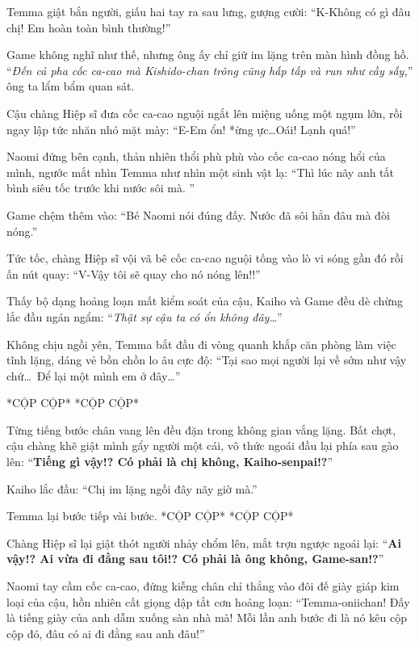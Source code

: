 \documentclass[../main.tex]{subfiles}
\begin{document}
Temma giật bắn người, giấu hai tay ra sau lưng, gượng cười: ``K-Không có gì đâu chị! Em hoàn toàn bình thường!''

Game không nghĩ như thế, nhưng ông ấy chỉ giữ im lặng trên màn hình đồng hồ. ``\textit{Đến cả pha cốc ca-cao mà Kishido-chan trông cũng hấp tấp và run như cầy sấy,}'' ông ta lẩm bẩm quan sát.

Cậu chàng Hiệp sĩ đưa cốc ca-cao nguội ngắt lên miệng uống một ngụm lớn, rồi ngay lập tức nhăn nhó mặt mày: ``E-Em ổn! *ừng ực\dots* Oái! Lạnh quá!''

Naomi đứng bên cạnh, thản nhiên thổi phù phù vào cốc ca-cao nóng hổi của mình, ngước mắt nhìn Temma như nhìn một sinh vật lạ: ``Thì lúc nãy anh tắt bình siêu tốc trước khi nước sôi mà. ''

Game chệm thêm vào: ``Bé Naomi nói đúng đấy. Nước đã sôi hẳn đâu mà đòi nóng.''

Tức tốc, chàng Hiệp sĩ vội vã bê cốc ca-cao nguội tống vào lò vi sóng gần đó rồi ấn nút quay: ``V-Vậy tôi sẽ quay cho nó nóng lên!!''


Thấy bộ dạng hoảng loạn mất kiểm soát của cậu, Kaiho và Game đều dè chừng lắc đầu ngán ngẩm: ``\textit{Thật sự cậu ta có ổn không đây\dots}''

Không chịu ngồi yên, Temma bắt đầu đi vòng quanh khắp căn phòng làm việc tĩnh lặng, dáng vẻ bồn chồn lo âu cực độ: ``Tại sao mọi người lại về sớm như vậy chứ\dots\ Để lại một mình em ở đây\dots''

*CỘP CỘP* *CỘP CỘP*

Từng tiếng bước chân vang lên đều đặn trong không gian vắng lặng. Bất chợt, cậu chàng khẽ giật mình gẩy người một cái, vô thức ngoái đầu lại phía sau gào lên: ``\textbf{Tiếng gì vậy!? Có phải là chị không, Kaiho-senpai!?}''

Kaiho lắc đầu: ``Chị im lặng ngồi đây nãy giờ mà.''

Temma lại bước tiếp vài bước. *CỘP CỘP* *CỘP CỘP*

Chàng Hiệp sĩ lại giật thót người nhảy chổm lên, mắt trợn ngược ngoái lại: ``\textbf{Ai vậy!? Ai vừa đi đằng sau tôi!? Có phải là ông không, Game-san!?}''


Naomi tay cầm cốc ca-cao, đứng kiễng chân chỉ thẳng vào đôi đế giày giáp kim loại của cậu, hồn nhiên cất giọng dập tắt cơn hoảng loạn: ``Temma-oniichan! Đấy là tiếng giày của anh dẫm xuống sàn nhà mà! Mỗi lần anh bước đi là nó kêu cộp cộp đó, đâu có ai đi đằng sau anh đâu!''
\end{document}
